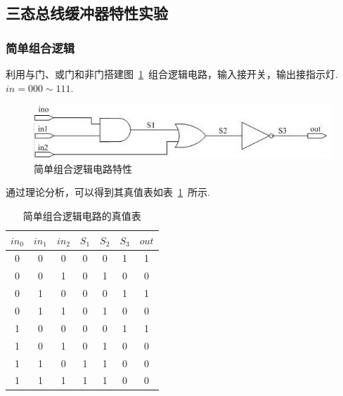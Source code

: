 \documentclass[11pt]{SEU-Digital-Report}
\begin{document}
        \subsection{三态总线缓冲器特性实验}

            \subsubsection{简单组合逻辑}

                利用与门、或门和非门搭建图~\ref{fig:1_circuit}~组合逻辑电路，输入接开关，输出接指示灯.
                $in=000\sim 111$.

                \begin{figure}[htbp]
                    \centering
                    \includegraphics[width=.5\linewidth]{fig/简单组合逻辑电路.jpg}
                    \caption{简单组合逻辑电路特性\cite{guide}}
                    \label{fig:1_circuit}
                \end{figure}

                通过理论分析，可以得到其真值表如表~\ref{tab:1_truth_table}~所示.

                \begin{table}[htbp]
                    \centering
                    \begin{tabular}{ccc|ccc|c}
                        \toprule
                        $in_0$ & $in_1$ & $in_2$ & $S_1$ & $S_2$ & $S_3$ & $out$ \\
                        \midrule
                        0 & 0 & 0 & 0 & 0 & 1 & 1 \\
                        0 & 0 & 1 & 0 & 1 & 0 & 0 \\
                        0 & 1 & 0 & 0 & 0 & 1 & 1 \\
                        0 & 1 & 1 & 0 & 1 & 0 & 0 \\
                        1 & 0 & 0 & 0 & 0 & 1 & 1 \\
                        1 & 0 & 1 & 0 & 1 & 0 & 0 \\
                        1 & 1 & 0 & 1 & 1 & 0 & 0 \\
                        1 & 1 & 1 & 1 & 1 & 0 & 0 \\
                        \bottomrule
                    \end{tabular}
                    \caption{简单组合逻辑电路的真值表}
                    \label{tab:1_truth_table}
                \end{table}
\end{document}
